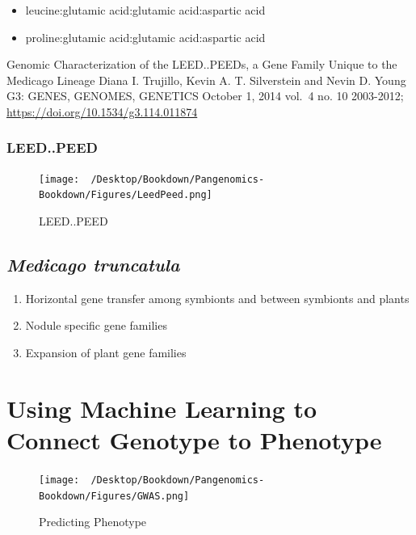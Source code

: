 \documentclass[
]{book}
\providecommand{\tightlist}{%
  \setlength{\itemsep}{0pt}\setlength{\parskip}{0pt}}
\begin{document}
\begin{itemize}
\tightlist
\item
  leucine:glutamic acid:glutamic acid:aspartic acid
\item
  proline:glutamic acid:glutamic acid:aspartic acid
\end{itemize}

Genomic Characterization of the LEED..PEEDs, a Gene Family Unique to the Medicago Lineage
Diana I. Trujillo, Kevin A. T. Silverstein and Nevin D. Young
G3: GENES, GENOMES, GENETICS October 1, 2014 vol.~4 no. 10 2003-2012; \url{https://doi.org/10.1534/g3.114.011874}

\hypertarget{leed..peed}{%
\subsubsection*{LEED..PEED}\label{leed..peed}}

\begin{figure}
\centering
\texttt{[image: ~/Desktop/Bookdown/Pangenomics-Bookdown/Figures/LeedPeed.png]}
\caption{LEED..PEED}
\end{figure}

\hypertarget{medicago-truncatula-1}{%
\subsection{\texorpdfstring{\emph{Medicago truncatula}}{Medicago truncatula}}\label{medicago-truncatula-1}}

\begin{enumerate}
\def\labelenumi{\arabic{enumi}.}
\item
  Horizontal gene transfer among symbionts and between symbionts and plants
\item
  Nodule specific gene families
\item
  Expansion of plant gene families
\end{enumerate}

\hypertarget{using-machine-learning-to-connect-genotype-to-phenotype}{%
\section{Using Machine Learning to Connect Genotype to Phenotype}\label{using-machine-learning-to-connect-genotype-to-phenotype}}

\begin{figure}
\centering
\texttt{[image: ~/Desktop/Bookdown/Pangenomics-Bookdown/Figures/GWAS.png]}
\caption{Predicting Phenotype}
\end{figure}
\end{document}
